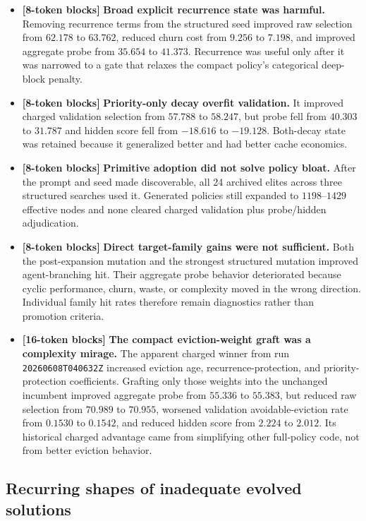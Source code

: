 \documentclass[11pt]{article}
\newcommand{\code}[1]{\texttt{\detokenize{#1}}}
\newcommand{\identifier}[1]{\nolinkurl{#1}}
\newcommand{\blocktag}[1]{\textbf{\color{navy}[#1-token blocks]}}
\begin{document}
\begin{itemize}
  \item \blocktag{8} \textbf{Broad explicit recurrence state was harmful.}  Removing recurrence
  terms from the structured seed improved raw selection from \(62.178\) to \(63.762\),
  reduced churn cost from \(9.256\) to \(7.198\), and improved aggregate probe from
  \(35.654\) to \(41.373\).  Recurrence was useful only after it was narrowed to a
  gate that relaxes the compact policy's categorical deep-block penalty.
  \item \blocktag{8} \textbf{Priority-only decay overfit validation.}  It improved charged
  validation selection from \(57.788\) to \(58.247\), but probe fell from \(40.303\) to
  \(31.787\) and hidden score fell from \(-18.616\) to \(-19.128\).  Both-decay state
  was retained because it generalized better and had better cache economics.
  \item \blocktag{8} \textbf{Primitive adoption did not solve policy bloat.}  After the prompt and
  seed made \code{MultiTimescaleDecay.observe_vector} discoverable, all 24 archived
  elites across three structured searches used it.  Generated policies still expanded
  to \(1198\)--\(1429\) effective nodes and none cleared charged validation plus
  probe/hidden adjudication.
  \item \blocktag{8} \textbf{Direct target-family gains were not sufficient.}  Both the
  post-expansion mutation and the strongest structured mutation improved
  agent-branching hit.  Their aggregate probe behavior deteriorated because cyclic
  performance, churn, waste, or complexity moved in the wrong direction.  Individual
  family hit rates therefore remain diagnostics rather than promotion criteria.
  \item \blocktag{16} \textbf{The compact eviction-weight graft was a complexity mirage.}  The
  apparent charged winner from run \identifier{20260608T040632Z} increased eviction
  age, recurrence-protection, and priority-protection coefficients.  Grafting only
  those weights into the unchanged incumbent improved aggregate probe from \(55.336\)
  to \(55.383\), but reduced raw selection from \(70.989\) to \(70.955\), worsened
  validation avoidable-eviction rate from \(0.1530\) to \(0.1542\), and reduced hidden
  score from \(2.224\) to \(2.012\).  Its historical charged advantage came from
  simplifying other full-policy code, not from better eviction behavior.
\end{itemize}

\subsection{Recurring shapes of inadequate evolved solutions}
\end{document}
